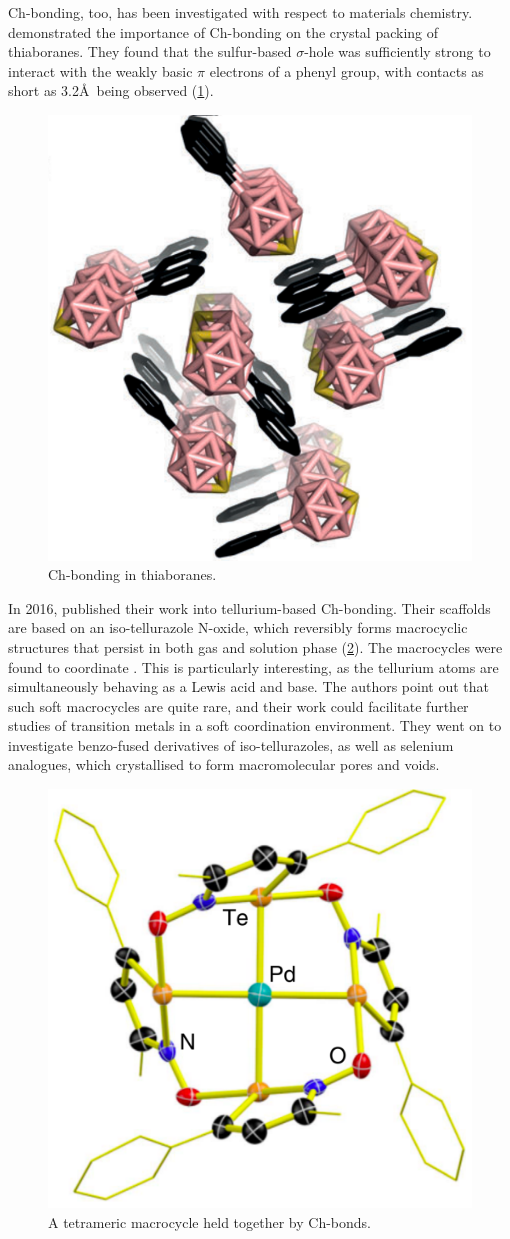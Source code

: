 \begin{refsection}
Ch-bonding, too, has been investigated with respect to materials chemistry.
\citeauthor{Fanfrlik2014} demonstrated the importance of Ch-bonding on the crystal packing of thiaboranes.\autocite{Fanfrlik2014}
They found that the sulfur-based $\sigma$-hole was sufficiently strong to interact with the weakly basic $\pi$ electrons of a phenyl group, with contacts as short as 3.2\AA~being observed (\cref{fig:thiaborane-ch-bond}).

\begin{figure}
    \centering
    \includegraphics[width=0.3\linewidth]{Figures/thiaborane-ch-bond.pdf}
    \caption{Ch-bonding in thiaboranes.\autocite{Fanfrlik2014}}
    \label{fig:thiaborane-ch-bond}
\end{figure}

In 2016, \citeauthor{Ho2016} published their work into tellurium-based Ch-bonding.\autocite{Ho2016}
Their scaffolds are based on an iso-tellurazole N-oxide, which reversibly forms macrocyclic structures that persist in both gas and solution phase (\cref{fig:te-pd-macrocycle}).
The macrocycles were found to coordinate .
This is particularly interesting, as the tellurium atoms are simultaneously behaving as a Lewis acid and base.
The authors point out that such soft macrocycles are quite rare, and their work could facilitate further studies of transition metals in a soft coordination environment.
They went on to investigate benzo-fused derivatives of iso-tellurazoles, as well as selenium analogues, which crystallised to form macromolecular pores and voids.\autocite{Ho2017}

\begin{figure}
    \centering
    \includegraphics[width=0.4\linewidth]{Figures/te-pd-macrocycle.pdf}
    \caption{A tetrameric macrocycle held together by Ch-bonds.\autocite{Ho2016}}
    \label{fig:te-pd-macrocycle}
\end{figure}


\end{refsection}
